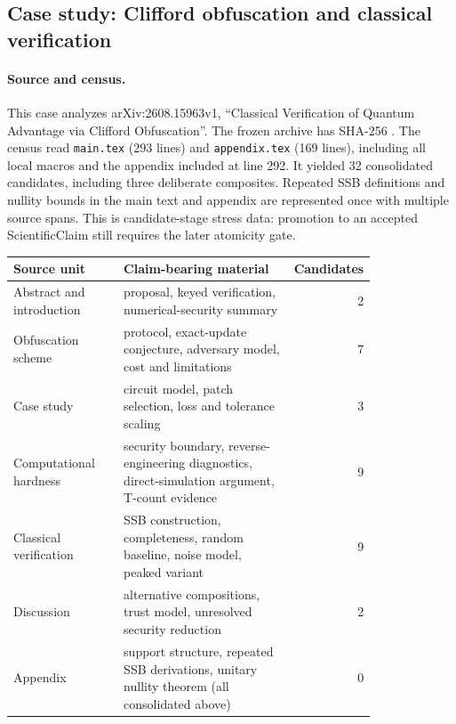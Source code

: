 \subsection{Case study: Clifford obfuscation and classical verification}\label{case:2608-15963}

\paragraph{Source and census.}
This case analyzes arXiv:2608.15963v1, ``Classical Verification of Quantum Advantage via Clifford Obfuscation''. The frozen archive has SHA-256 . The census read \texttt{main.tex} (293 lines) and \texttt{appendix.tex} (169 lines), including all local macros and the appendix included at line 292. It yielded 32 consolidated candidates, including three deliberate composites. Repeated SSB definitions and nullity bounds in the main text and appendix are represented once with multiple source spans. This is candidate-stage stress data: promotion to an accepted ScientificClaim still requires the later atomicity gate.

\begin{center}
\begin{tabular}{p{0.31\linewidth}p{0.50\linewidth}r}
\toprule
Source unit & Claim-bearing material & Candidates\\
\midrule
Abstract and introduction & proposal, keyed verification, numerical-security summary & 2\\
Obfuscation scheme & protocol, exact-update conjecture, adversary model, cost and limitations & 7\\
Case study & circuit model, patch selection, loss and tolerance scaling & 3\\
Computational hardness & security boundary, reverse-engineering diagnostics, direct-simulation argument, T-count evidence & 9\\
Classical verification & SSB construction, completeness, random baseline, noise model, peaked variant & 9\\
Discussion & alternative compositions, trust model, unresolved security reduction & 2\\
Appendix & support structure, repeated SSB derivations, unitary nullity theorem (all consolidated above) & 0\\
\bottomrule
\end{tabular}
\end{center}

